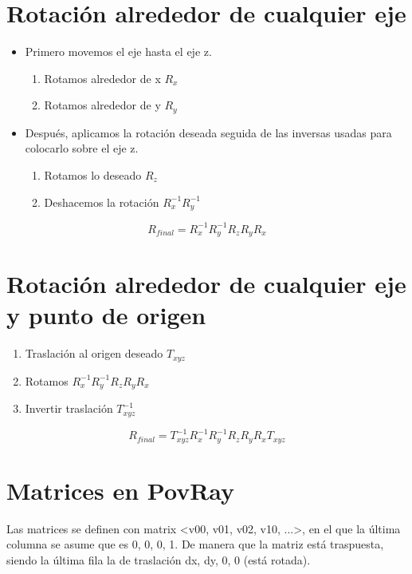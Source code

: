 \section{Rotación alrededor de cualquier eje}
\begin{itemize}
	\item Primero movemos el eje hasta el eje z.
	      \begin{enumerate}
		      \item Rotamos alrededor de x $R_x$
		      \item Rotamos alrededor de y $R_y$
	      \end{enumerate}
	\item Después, aplicamos la rotación deseada seguida de las inversas usadas para colocarlo sobre el eje z.
	      \begin{enumerate}
		      \item Rotamos lo deseado $R_z$
		      \item Deshacemos la rotación $R_x^{-1}R_y^{-1}$
	      \end{enumerate}
\end{itemize}
$$R_{final}=R_x^{-1}R_y^{-1}R_zR_yR_x$$

\section{Rotación alrededor de cualquier eje y punto de origen}
\begin{enumerate}
	\item Traslación al origen deseado $T_{xyz}$
	\item Rotamos $R_x^{-1}R_y^{-1}R_zR_yR_x$
	\item Invertir traslación $T_{xyz}^{-1}$
\end{enumerate}
$$R_{final}=T_{xyz}^{-1}R_x^{-1}R_y^{-1}R_zR_yR_xT_{xyz}$$

\section{Matrices en PovRay}
Las matrices se definen con matrix <v00, v01, v02, v10, ...>, en el que la última columna se asume que es 0, 0, 0, 1. De manera que la matriz está traspuesta, siendo la última fila la de traslación dx, dy, 0, 0 (está rotada).